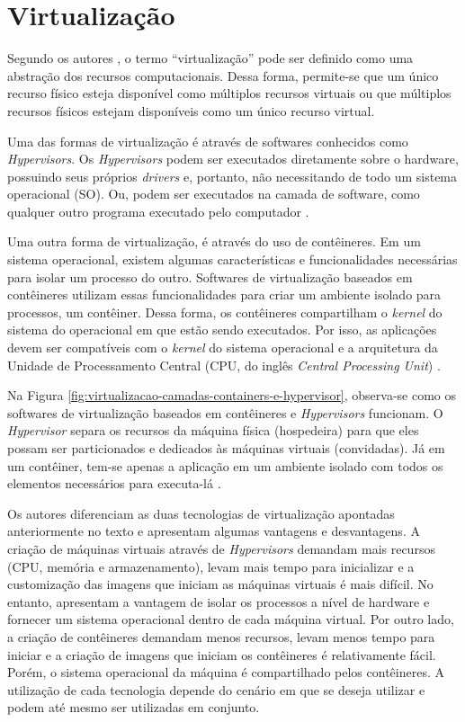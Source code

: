\section{Virtualização}

Segundo os autores , o termo ``virtualização'' pode ser definido como uma abstração dos recursos computacionais. Dessa forma, permite-se que um único recurso físico esteja disponível como múltiplos recursos virtuais ou que múltiplos recursos físicos estejam disponíveis como um único recurso virtual.

Uma das formas de virtualização é através de softwares conhecidos como \textit{Hypervisors}. Os \textit{Hypervisors} podem ser executados diretamente sobre o hardware, possuindo seus próprios \textit{drivers} e, portanto, não necessitando de todo um sistema operacional (SO). Ou, podem ser executados na camada de software, como qualquer outro programa executado pelo computador \cite{eder2016virtualization} \cite{jain2016virtualization}.

Uma outra forma de virtualização, é através do uso de contêineres. Em um sistema operacional, existem algumas características e funcionalidades necessárias para isolar um processo do outro. Softwares de virtualização baseados em contêineres utilizam essas funcionalidades para criar um ambiente isolado para processos, um contêiner. Dessa forma, os contêineres compartilham o \textit{kernel} do sistema do operacional em que estão sendo executados. Por isso, as aplicações devem ser compatíveis com o \textit{kernel} do sistema operacional e a arquitetura da Unidade de Processamento Central (CPU, do inglês \textit{Central Processing Unit}) \cite{eder2016virtualization}.

Na Figura \ref{fig:virtualizacao-camadas-containers-e-hypervisor}, observa-se como os softwares de virtualização baseados em contêineres e \textit{Hypervisors} funcionam. O \textit{Hypervisor} separa os recursos da máquina física (hospedeira) para que eles possam ser particionados e dedicados às máquinas virtuais (convidadas). Já em um contêiner, tem-se apenas a aplicação em um ambiente isolado com todos os elementos necessários para executa-lá \cite{potdar2020docker}.

Os autores  diferenciam as duas tecnologias de virtualização apontadas anteriormente no texto e apresentam algumas vantagens e desvantagens. A criação de máquinas virtuais através de \textit{Hypervisors} demandam mais recursos (CPU, memória e armazenamento), levam mais tempo para inicializar e a customização das imagens que iniciam as máquinas virtuais é mais difícil. No entanto, apresentam a vantagem de isolar os processos a nível de hardware e fornecer um sistema operacional dentro de cada máquina virtual. Por outro lado, a criação de contêineres demandam menos recursos, levam menos tempo para iniciar e a criação de imagens que iniciam os contêineres é relativamente fácil. Porém, o sistema operacional da máquina é compartilhado pelos contêineres. A utilização de cada tecnologia depende do cenário em que se deseja utilizar e podem até mesmo ser utilizadas em conjunto.

